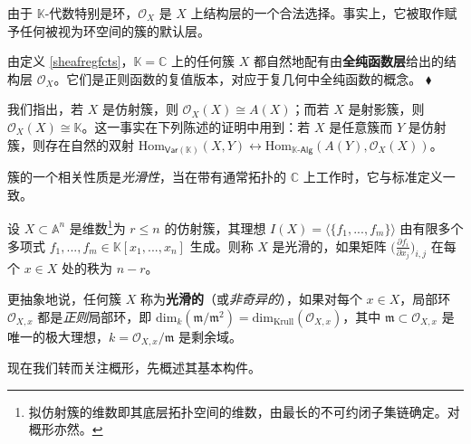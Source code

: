 由于 $\mathbb{K}$-代数特别是环，$\mathcal{O}_X$ 是 $X$ 上结构层的一个合法选择。事实上，它被取作赋予任何被视为环空间的簇的默认层。

\begin{Ex}\label{sheafholofcts}
由定义 \ref{sheafregfcts}，$\mathbb{K}=\mathbb{C}$ 上的任何簇 $X$ 都自然地配有由\textbf{全纯函数层}给出的结构层 $\mathcal{O}_X$。它们是正则函数的复值版本，对应于复几何中全纯函数的概念。  \hfill $\blacklozenge$
\end{Ex}

我们指出，若 $X$ 是仿射簇，则 $\mathcal{O}_X(X)\cong A(X)$；而若 $X$ 是射影簇，则 $\mathcal{O}_X(X)\cong\mathbb{K}$。这一事实在下列陈述的证明中用到：若 $X$ 是任意簇而 $Y$ 是仿射簇，则存在自然的双射 $\text{Hom}_{\mathsf{Var}(\mathbb{K})}(X,Y)\leftrightarrow\text{Hom}_{\mathbb{K}\text{-}\mathsf{Alg}}(A(Y),\mathcal{O}_X(X))$。

簇的一个相关性质是\textit{光滑性}，当在带有通常拓扑的 $\mathbb{C}$ 上工作时，它与标准定义一致。

\begin{Def}\label{smoothvar}
设 $X\subset\mathbb{A}^n$ 是维数\footnote{拟仿射簇的维数即其底层拓扑空间的维数，由最长的不可约闭子集链确定。对概形亦然。}为 $r\leq n$ 的仿射簇，其理想 $I(X)=\langle\{f_1,...,f_m\}\rangle$ 由有限多个多项式 $f_1,...,f_m\in\mathbb{K}[x_1,...,x_n]$ 生成。则称 $X$ 是光滑的，如果矩阵 $\Big(\frac{\partial f_i}{\partial x_j}\Big)_{\!i,j}$ 在每个 $x\in X$ 处的秩为 $n-r$。

更抽象地说，任何簇 $X$ 称为\textbf{光滑的}（或\textit{非奇异的}），如果对每个 $x\in X$，局部环 $\mathcal{O}_{X,x}$ 都是\textit{正则}局部环，即 $\text{dim}_k(\mathfrak{m}/\mathfrak{m}^2)=\text{dim}_\text{Krull}(\mathcal{O}_{X,x})$，其中 $\mathfrak{m}\subset\mathcal{O}_{X,x}$ 是唯一的极大理想，$k=\mathcal{O}_{X,x}/\mathfrak{m}$ 是剩余域。 
\end{Def}
\vspace*{0.5cm}

\noindent 现在我们转而关注概形，先概述其基本构件。 

